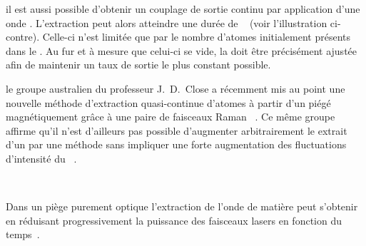 \spppace
{} 
\hpppace
\begin{minipage}{\sssize}
\begin{ditemize}
	\item il est aussi possible d'obtenir un couplage de sortie continu par application d'une onde \rf. L'extraction  peut alors atteindre une durée  de ~\cite{BHE99} (voir l'illustration ci-contre). Celle-ci n'est limitée que par le nombre d'atomes initialement présents dans le \becc. Au fur et à mesure que celui-ci se vide, la \rf doit être précisément ajustée afin de maintenir un taux de sortie le plus constant possible.
\end{ditemize}
\end{minipage}

\spppace
\hpppace
\begin{minipage}{\sssize}
\begin{ditemize}
	\item le groupe australien du professeur J.~D.~Close a récemment mis au point une nouvelle méthode d'extraction quasi-continue d'atomes à partir d'un \becc piégé magnétiquement grâce à une paire de faisceaux Raman ~\cite{RFH06}. 
	Ce même groupe affirme qu'il n'est d'ailleurs  pas possible d'augmenter arbitrairement le \fat extrait d'un \becc par une méthode \rf sans impliquer une forte  augmentation des fluctuations d'intensité du \lat~\cite{RMH05}.
\end{ditemize}
\end{minipage}

~
\casse

\noindent
	Dans un piège purement optique l'extraction de l'onde de matière peut s'obtenir en réduisant progressivement la puissance des faisceaux lasers en fonction du temps~\cite{CRG03a}. %



